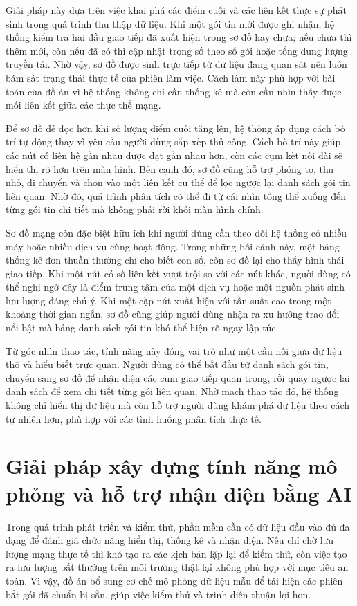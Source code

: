 \documentclass[../DoAn.tex]{subfiles}
\begin{document}
Giải pháp này dựa trên việc khai phá các điểm cuối và các liên kết thực sự phát sinh trong quá trình thu thập dữ liệu. Khi một gói tin mới được ghi nhận, hệ thống kiểm tra hai đầu giao tiếp đã xuất hiện trong sơ đồ hay chưa; nếu chưa thì thêm mới, còn nếu đã có thì cập nhật trọng số theo số gói hoặc tổng dung lượng truyền tải. Nhờ vậy, sơ đồ được sinh trực tiếp từ dữ liệu đang quan sát nên luôn bám sát trạng thái thực tế của phiên làm việc. Cách làm này phù hợp với bài toán của đồ án vì hệ thống không chỉ cần thống kê mà còn cần nhìn thấy được mối liên kết giữa các thực thể mạng.

Để sơ đồ dễ đọc hơn khi số lượng điểm cuối tăng lên, hệ thống áp dụng cách bố trí tự động thay vì yêu cầu người dùng sắp xếp thủ công. Cách bố trí này giúp các nút có liên hệ gần nhau được đặt gần nhau hơn, còn các cụm kết nối dài sẽ hiển thị rõ hơn trên màn hình. Bên cạnh đó, sơ đồ cũng hỗ trợ phóng to, thu nhỏ, di chuyển và chọn vào một liên kết cụ thể để lọc ngược lại danh sách gói tin liên quan. Nhờ đó, quá trình phân tích có thể đi từ cái nhìn tổng thể xuống đến từng gói tin chi tiết mà không phải rời khỏi màn hình chính.

Sơ đồ mạng còn đặc biệt hữu ích khi người dùng cần theo dõi hệ thống có nhiều máy hoặc nhiều dịch vụ cùng hoạt động. Trong những bối cảnh này, một bảng thống kê đơn thuần thường chỉ cho biết con số, còn sơ đồ lại cho thấy hình thái giao tiếp. Khi một nút có số liên kết vượt trội so với các nút khác, người dùng có thể nghi ngờ đây là điểm trung tâm của một dịch vụ hoặc một nguồn phát sinh lưu lượng đáng chú ý. Khi một cặp nút xuất hiện với tần suất cao trong một khoảng thời gian ngắn, sơ đồ cũng giúp người dùng nhận ra xu hướng trao đổi nổi bật mà bảng danh sách gói tin khó thể hiện rõ ngay lập tức.

Từ góc nhìn thao tác, tính năng này đóng vai trò như một cầu nối giữa dữ liệu thô và hiểu biết trực quan. Người dùng có thể bắt đầu từ danh sách gói tin, chuyển sang sơ đồ để nhận diện các cụm giao tiếp quan trọng, rồi quay ngược lại danh sách để xem chi tiết từng gói liên quan. Nhờ mạch thao tác đó, hệ thống không chỉ hiển thị dữ liệu mà còn hỗ trợ người dùng khám phá dữ liệu theo cách tự nhiên hơn, phù hợp với các tình huống phân tích thực tế.

\section{Giải pháp xây dựng tính năng mô phỏng và hỗ trợ nhận diện bằng AI}
Trong quá trình phát triển và kiểm thử, phần mềm cần có dữ liệu đầu vào đủ đa dạng để đánh giá chức năng hiển thị, thống kê và nhận diện. Nếu chỉ chờ lưu lượng mạng thực tế thì khó tạo ra các kịch bản lặp lại để kiểm thử, còn việc tạo ra lưu lượng bất thường trên môi trường thật lại không phù hợp với mục tiêu an toàn. Vì vậy, đồ án bổ sung cơ chế mô phỏng dữ liệu mẫu để tái hiện các phiên bắt gói đã chuẩn bị sẵn, giúp việc kiểm thử và trình diễn thuận lợi hơn.
\end{document}
